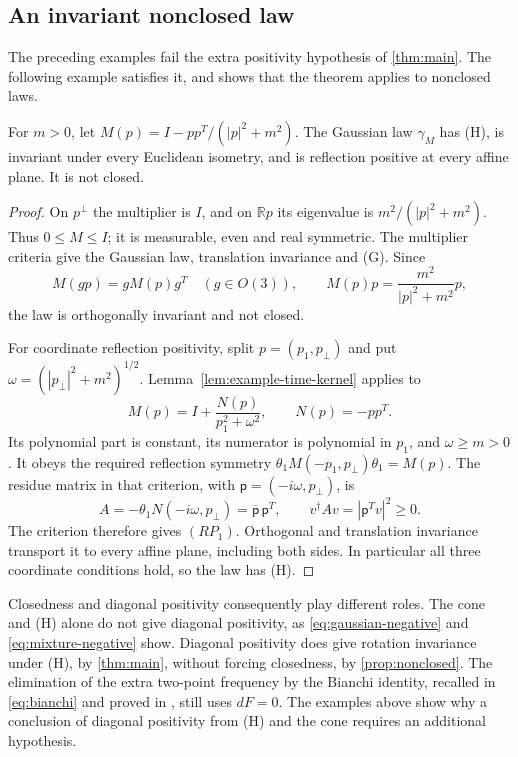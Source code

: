 \documentclass[11pt,letterpaper,reqno]{amsart}
\makeatletter
\theoremstyle{definition}
\newcommand{\ms@minorstart}{%
  \pushQED{\qed}\renewcommand{\qedsymbol}{$\blacksquare$}}
\newenvironment{proposition}[1][]{\ms@minorstart\ms@proposition[#1]}
  {\popQED\endms@proposition}
\theoremstyle{remark}
\newcommand{\R}{\mathbb R}\newcommand{\C}{\mathbb C}
\makeatother
\begin{document}
\subsection{An invariant nonclosed law}

The preceding examples fail the extra positivity hypothesis of
\cref{thm:main}. The following example satisfies it, and shows
that the theorem applies to nonclosed laws.

\begin{proposition}[An invariant nonclosed law]\label{prop:nonclosed}
For $m>0$, let $M(p)=I-pp^T/(|p|^2+m^2)$. The Gaussian law
$\gamma_M$ has (H), is invariant under every Euclidean isometry,
and is reflection positive at every affine plane. It is not closed.
\end{proposition}

\begin{proof}
On $p^\perp$ the multiplier is $I$, and on $\R p$ its eigenvalue is
$m^2/(|p|^2+m^2)$. Thus $0\le M\le I$; it is measurable, even and
real symmetric. The multiplier criteria give the Gaussian law,
translation invariance and (G). Since
\[
 M(gp)=gM(p)g^T\quad(g\in O(3)),\qquad
 M(p)p=\frac{m^2}{|p|^2+m^2}p,
\]
the law is orthogonally invariant and not closed.

For coordinate reflection positivity, split $p=(p_1,p_\perp)$ and
put $\omega=(|p_\perp|^2+m^2)^{1/2}$.
Lemma~\ref{lem:example-time-kernel} applies to
\[
 M(p)=I+\frac{N(p)}{p_1^2+\omega^2},\qquad N(p)=-pp^T.
\]
Its polynomial part is constant, its numerator is polynomial in
$p_1$, and $\omega\ge m>0$. It obeys the required reflection
symmetry $\theta_1M(-p_1,p_\perp)\theta_1=M(p)$.
The residue matrix in that criterion, with
$\mathsf p=(-i\omega,p_\perp)$, is
\[
 A=-\theta_1N(-i\omega,p_\perp)
   =\overline{\mathsf p}\,\mathsf p^T,\qquad
 v^\dagger Av=|\mathsf p^Tv|^2\ge0.
\]
The criterion therefore gives $(RP_1)$. Orthogonal and translation
invariance transport it to every affine plane, including both sides.
In particular all three coordinate conditions hold, so the law has
(H).
\end{proof}

Closedness and diagonal positivity consequently play different roles.
The cone and (H) alone do not give diagonal positivity, as
\eqref{eq:gaussian-negative} and \eqref{eq:mixture-negative} show.
Diagonal positivity does give rotation invariance under (H), by
\cref{thm:main}, without forcing closedness, by
\cref{prop:nonclosed}. The elimination of the extra two-point
frequency by the Bianchi identity, recalled in
\cref{eq:bianchi} and proved in \cite[Section~8.5]{QEDCurrent},
still uses $dF=0$. The examples above show why a conclusion of
diagonal positivity from (H) and the cone requires an additional
hypothesis.
\end{document}

